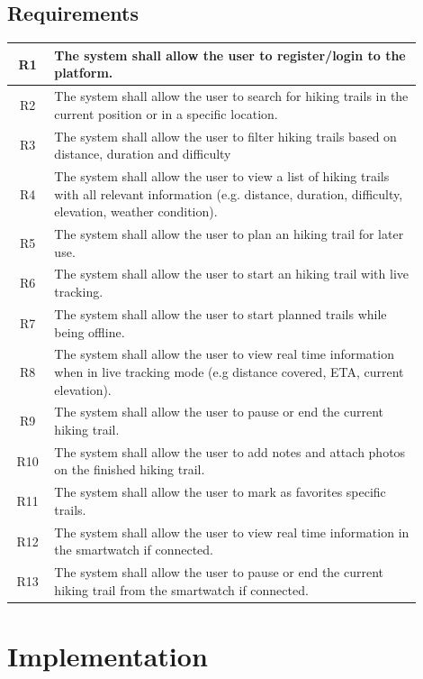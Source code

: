 \documentclass[12pt]{article}
\begin{document}
\subsection{Requirements}

\begin{center}
\begin{tabular}{ |c|p{0.9\linewidth}| } 
 \hline
 R1 & The system shall allow the user to register/login to the platform.\\
 \hline
 R2 & The system shall allow the user to search for hiking trails in the current position or in a specific location.\\
 \hline
 R3 & The system shall allow the user to filter hiking trails based on distance, duration and difficulty \\
 \hline
 R4 & The system shall allow the user to view a list of hiking trails with all relevant information (e.g. distance, duration, difficulty, elevation, weather condition).\\
 \hline
 R5 & The system shall allow the user to plan an hiking trail for later use. \\
 \hline
 R6 & The system shall allow the user to start an hiking trail with live tracking. \\
 \hline
 R7 & The system shall allow the user to start planned trails while being offline. \\
 \hline
 R8 & The system shall allow the user to view real time information when in live tracking mode (e.g distance covered, ETA, current elevation). \\
 \hline
 R9 & The system shall allow the user to pause or end the current hiking trail. \\
 \hline
 R10 & The system shall allow the user to add notes and attach photos on the finished hiking trail. \\
 \hline
 R11 & The system shall allow the user to mark as favorites specific trails. \\
 \hline
 R12 & The system shall allow the user to view real time information in the smartwatch if connected. \\
 \hline
 R13 & The system shall allow the user to pause or end the current hiking trail from the smartwatch if connected.\\
 \hline
\end{tabular}
\end{center}

\newpage

\section{Implementation}
\end{document}

